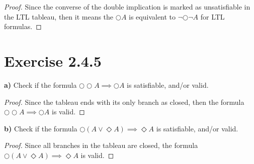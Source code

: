 \documentclass[titlepage, letterpaper, fleqn]{article}
\newcommand{\spacepls}{\vspace{5mm}}
\begin{document}
\begin{proof}
Since the converse of the double implication is marked as unsatisfiable in the LTL tableau,
then it means the \(\bigcirc A\) is equivalent to \(\neg \bigcirc \neg A\) for LTL formulas.
\end{proof}

\section{Exercise 2.4.5}

{\large \textbf{a)} Check if the formula \(\bigcirc \bigcirc A \implies \bigcirc A\) is satisfiable, and/or valid.}

\spacepls


\begin{proof}
Since the tableau ends with its only branch as closed, then the formula \(\bigcirc \bigcirc A \implies \bigcirc A\) is valid.
\end{proof}

{\large \textbf{b)} Check if the formula \(\bigcirc (A \vee \Diamond A) \implies \Diamond A\) is satisfiable, and/or valid.}


\begin{proof}
Since all branches in the tableau are closed, the formula \(\bigcirc (A \vee \Diamond A) \implies \Diamond A\) is valid.
\end{proof}
\end{document}
